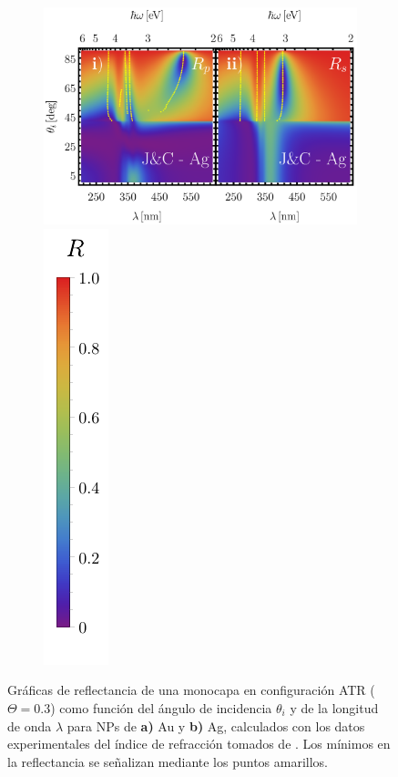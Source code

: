 \documentclass[letterpaper,11pt] {article}
\begin{document}
\begin{figure}[h!]
	\begin{subfigure}{.45\linewidth}\centering \includegraphics[width = .95\linewidth]{6-JCAg/0-2D_Grid.png}\includegraphics[scale=.6, trim={00 00 00 00}, clip]{0-RBar_v}\end{subfigure}
	\caption{Gráficas de reflectancia de una monocapa en configuración ATR ($\Theta = 0. 3$) como función del ángulo de incidencia $\theta_i$ y de la longitud de onda $\lambda$ para NPs de \textbf{a)} Au y \textbf{b)} Ag, calculados con los datos experimentales del índice de refracción tomados de \cite{johnson1972contants}.  Los mínimos en la reflectancia se señalizan mediante los puntos amarillos. }\label{fig:R-JC}
	\end{figure}	
\end{document}
